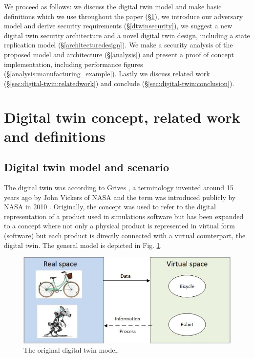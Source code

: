 We proceed as follows: we discuss the digital twin model and make basic definitions which we use throughout the paper (\S \ref{Dtwinconcept}), we introduce our adversary model and derive security requirements (\S \ref{dtwinsecurity}),  we suggest a new digital twin security architecture and a novel digital twin design, including a state replication model (\S \ref{architecturedesign}). We make a security analysis of the proposed model and architecture (\S \ref{analysis}) and present a proof of concept implementation, including performance figures (\S \ref{analysis:manufacturing_example}). Lastly we discuss related work (\S \ref{sec:digital-twin:relatedwork}) and conclude (\S \ref{sec:digital-twin:conclusion}).

\section{Digital twin concept, related work and definitions}
\label{Dtwinconcept}
\subsection{Digital twin model and scenario}
\label{Dtwinconcept:model}
The digital twin was according to Grives \cite{Grives2014}, a terminology invented around 15 years ago by John Vickers of NASA and the term was introduced publicly by NASA in 2010 \cite{Shafto2010}. Originally, the concept was used to refer to the digital representation of a product used in simulations software but has been expanded to a concept where not only a physical product is represented in virtual form (software) but each product is directly connected with a virtual counterpart, the digital twin. The general model is depicted in Fig. \ref{figure:digital_twin_model}.

\begin{figure}[ht]
   \centering
    \includegraphics[scale=0.5]{papers/digital-twin/images/FIG1_TII-19-1326}
    \caption{The original digital twin model.}
    \label{figure:digital_twin_model}
\end{figure}

